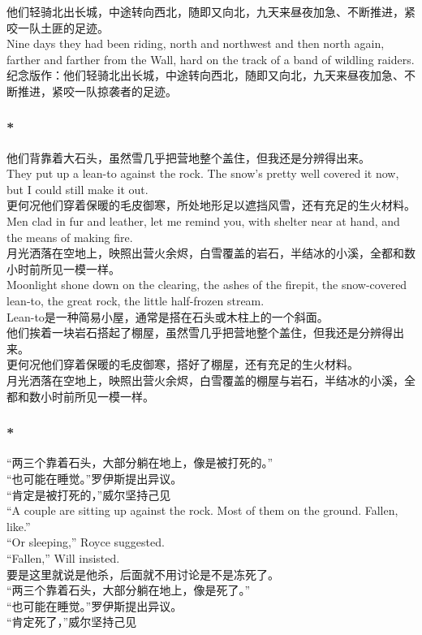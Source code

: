 \documentclass[12pt,a4paper]{article}
\begin{document}
\subsubsection{} 
{\color{blue}他们轻骑北出长城，中途转向西北，随即又向北，九天来昼夜加急、不断推进，紧咬一队土匪的足迹。\\
Nine days they had been riding, north and northwest and then north again, farther and farther from the Wall, hard on the track of a band of wildling raiders.}\\
纪念版作：他们轻骑北出长城，中途转向西北，随即又向北，九天来昼夜加急、不断推进，紧咬一队掠袭者的足迹。

\subsubsection{\color{red}*}{\color{blue}	
他们背靠着大石头，虽然雪几乎把营地整个盖住，但我还是分辨得出来。\\
They put up a lean-to against the rock. The snow's pretty well covered it now, but I could still make it out.\\
更何况他们穿着保暖的毛皮御寒，所处地形足以遮挡风雪，还有充足的生火材料。\\
Men clad in fur and leather, let me remind you, with shelter near at hand, and the means of making fire.\\
月光洒落在空地上，映照出营火余烬，白雪覆盖的岩石，半结冰的小溪，全都和数小时前所见一模一样。\\
Moonlight shone down on the clearing, the ashes of the firepit, the snow-covered lean-to, the great rock, the little half-frozen stream.}\\
{\color{red}Lean-to是一种简易小屋，通常是搭在石头或木柱上的一个斜面。}\\
他们挨着一块岩石搭起了棚屋，虽然雪几乎把营地整个盖住，但我还是分辨得出来。\\
更何况他们穿着保暖的毛皮御寒，搭好了棚屋，还有充足的生火材料。\\
月光洒落在空地上，映照出营火余烬，白雪覆盖的棚屋与岩石，半结冰的小溪，全都和数小时前所见一模一样。

\subsubsection{\color{red}*}{\color{blue}
“两三个靠着石头，大部分躺在地上，像是被打死的。” \\
“也可能在睡觉。”罗伊斯提出异议。\\
“肯定是被打死的，”威尔坚持己见\\
“A couple are sitting up against the rock. Most of them on the ground. Fallen, like.”\\
“Or sleeping,” Royce suggested.\\
 “Fallen,” Will insisted.}\\
{\color{red}要是这里就说是他杀，后面就不用讨论是不是冻死了。}\\
“两三个靠着石头，大部分躺在地上，像是死了。”\\ “也可能在睡觉。”罗伊斯提出异议。\\“肯定死了，”威尔坚持己见
\end{document}

